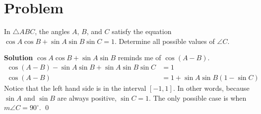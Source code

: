 \documentclass{article}
\newenvironment{solution}{\begin{trivlist}\item[]{\bf Solution}}{\qed \end{trivlist}}
\begin{document}
\section*{Problem}
In $\triangle{ABC}$, the angles $A$, $B$, and $C$ satisfy the equation $\cos A \cos B + \sin A \sin B \sin C = 1$. Determine all possible values of $\angle{C}$.
\begin{solution}
$\cos A \cos B + \sin A \sin B$ reminds me of $\cos(A - B)$.
\begin{align*}
    \cos(A - B) - \sin A \sin B + \sin A \sin B \sin C &= 1 \\
    \cos(A - B) &= 1 + \sin A \sin B (1 - \sin C)
\end{align*}
Notice that the left hand side is in the interval $[-1, 1]$. In other words, because $\sin A$ and $\sin B$ are always positive, $\sin C = 1$. The only possible case is when $\boxed{m\angle{C} = 90^\circ}$.
\end{solution}

\newpage
\end{document}
